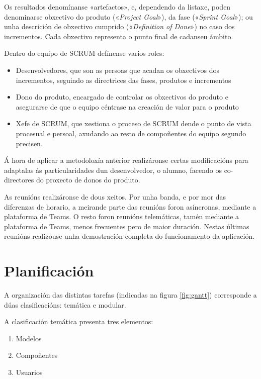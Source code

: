 Os resultados denomínanse «artefactos», e, dependendo da listaxe, poden denominarse obxectivo do produto («\textit{Project Goal}»), da fase («\textit{Sprint Goal}»); ou unha descrición de obxectivo cumprido («\textit{Definition of Done}») no caso dos incrementos. Cada obxectivo representa o punto final de cadanseu ámbito.

Dentro do equipo de SCRUM defínense varios roles:

\begin{itemize}
	\item Desenvolvedores, que son as persoas que acadan os obxectivos dos incrementos, seguindo as directrices das fases, produtos e incrementos
	\item Dono do produto, encargado de controlar os obxectivos do produto e asegurarse de que o equipo céntrase na creación de valor para o produto
	\item Xefe de SCRUM, que xestiona o proceso de SCRUM dende o punto de vista procesual e persoal, axudando ao resto de compoñentes do equipo segundo precisen.
\end{itemize}

Á hora de aplicar a metodoloxía anterior realizáronse certas modificacións para adaptalas ás particularidades dun desenvolvedor, o alumno, facendo os co-directores do proxecto de donos do produto.

As reunións realizáronse de dous xeitos. Por unha banda, e por mor das diferenzas de horario, a meirande parte das reunións foron asíncronas, mediante a plataforma de Teams. O resto foron reunións telemáticas, tamén mediante a plataforma de Teams, menos frecuentes pero de maior duración. Nestas últimas reunións realizouse unha demostración completa do funcionamento da aplicación. 

\section{Planificación}

A organización das distintas tarefas (indicadas na figura \ref{fig:gantt}) corresponde a dúas clasificacións: temática e modular.

\newpage

A clasificación temática presenta tres elementos:

\begin{enumerate}
	\item Modelos
	\item Compoñentes
	\item Usuarios
\end{enumerate}


